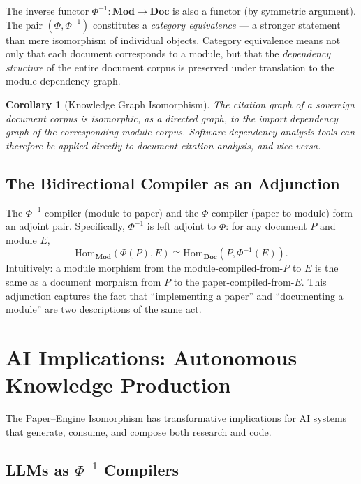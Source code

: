 \documentclass[12pt]{article}
\newtheorem{corollary}[theorem]{Corollary}
\begin{document}
The inverse functor $\Phi^{-1} : \mathbf{Mod} \to \mathbf{Doc}$ is also a
functor (by symmetric argument).  The pair $(\Phi, \Phi^{-1})$ constitutes a
\emph{category equivalence} — a stronger statement than mere isomorphism of
individual objects.  Category equivalence means not only that each document
corresponds to a module, but that the \emph{dependency structure} of the entire
document corpus is preserved under translation to the module dependency graph.

\begin{corollary}[Knowledge Graph Isomorphism]
  The citation graph of a sovereign document corpus is isomorphic, as a directed
  graph, to the import dependency graph of the corresponding module corpus.
  Software dependency analysis tools can therefore be applied directly to
  document citation analysis, and vice versa.
\end{corollary}

\subsection{The Bidirectional Compiler as an Adjunction}

The $\Phi^{-1}$ compiler (module to paper) and the $\Phi$ compiler (paper to
module) form an adjoint pair.  Specifically, $\Phi^{-1}$ is left adjoint to
$\Phi$: for any document $P$ and module $E$,
\[
  \mathrm{Hom}_{\mathbf{Mod}}(\Phi(P), E) \cong \mathrm{Hom}_{\mathbf{Doc}}(P, \Phi^{-1}(E)).
\]
Intuitively: a module morphism from the module-compiled-from-$P$ to $E$ is the
same as a document morphism from $P$ to the paper-compiled-from-$E$.
This adjunction captures the fact that ``implementing a paper'' and ``documenting
a module'' are two descriptions of the same act.

\section{AI Implications: Autonomous Knowledge Production}
\label{sec:ai_implications}

The Paper--Engine Isomorphism has transformative implications for AI systems
that generate, consume, and compose both research and code.

\subsection{LLMs as $\Phi^{-1}$ Compilers}
\end{document}
